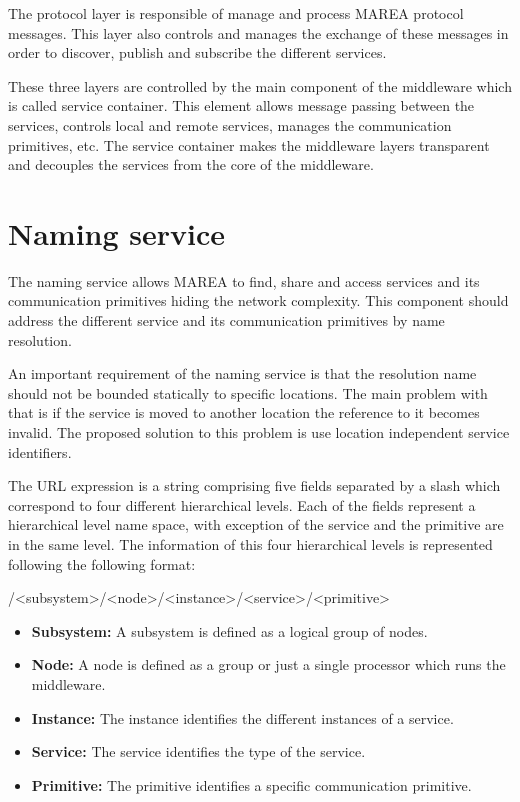 The protocol layer is responsible of manage and process MAREA protocol messages. This layer also controls and manages the exchange of these messages in order to discover, publish and subscribe the different services.

These three layers are controlled by the main component of the middleware which is called service container. This element allows message passing between the services, controls local and remote services, manages the communication primitives, etc. The service container makes the middleware layers transparent and decouples the services from the core of the middleware.

\section{Naming service}\label{S:MAREA-naming} 

The naming service allows MAREA to find, share and access services and its communication primitives hiding the network complexity. This component should address the different service and its communication primitives by name resolution. 

An important requirement of the naming service is that the resolution name should not be bounded statically to specific locations. The main problem with that is if the service is moved to another location the reference to it becomes invalid. The proposed solution to this problem is use location independent service identifiers.

The URL expression is a string comprising five fields separated by a slash which correspond to four different hierarchical levels. Each of the fields represent a hierarchical level name space, with exception of the service and the primitive are in the same level. The information of this four hierarchical levels is represented following the following format:

\begin{center}

/<subsystem>/<node>/<instance>/<service>/<primitive>
\end{center}

\begin{itemize}
\item \textbf{Subsystem:} A subsystem is defined as a logical group of nodes.  
\item \textbf{Node:} A node is defined as a group or just a single processor which runs the middleware.
\item \textbf{Instance:} The instance identifies the different instances of a service.
\item \textbf{Service:} The service identifies the type of the service.
\item \textbf{Primitive:} The primitive identifies a specific communication primitive.
\end{itemize}

